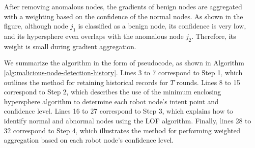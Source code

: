 \documentclass[lettersize,journal]{IEEEtran}
\begin{document}
After removing anomalous nodes, the gradients of benign nodes are aggregated with a weighting based on the confidence of the normal nodes. As shown in the figure, although node $j_1$ is classified as a benign node, its confidence is very low, and its hypersphere even overlaps with the anomalous node $j_2$. Therefore, its weight is small during gradient aggregation.


We summarize the algorithm in the form of pseudocode, as shown in Algorithm \ref{alg:malicious-node-detection-history}. Lines 3 to 7 correspond to Step 1, which outlines the method for retaining historical records for \(T\) rounds. Lines 8 to 15 correspond to Step 2, which describes the use of the minimum enclosing hypersphere algorithm to determine each robot node's intent point and confidence level. Lines 16 to 27 correspond to Step 3, which explains how to identify normal and abnormal nodes using the LOF algorithm. Finally, lines 28 to 32 correspond to Step 4, which illustrates the method for performing weighted aggregation based on each robot node's confidence level.
\end{document}
